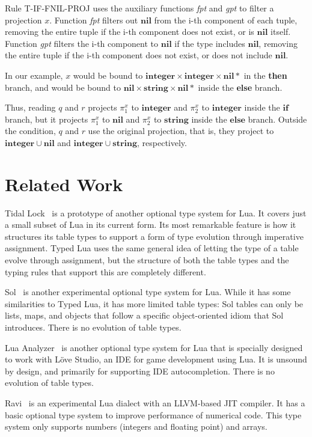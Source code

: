 \documentclass{sigplanconf}
\newcommand{\Nil}{\mathbf{nil}}
\newcommand{\Integer}{\mathbf{integer}}
\newcommand{\String}{\mathbf{string}}
\begin{document}
Rule \textsc{T-IF-FNIL-PROJ} uses the auxiliary functions \emph{fpt} and \emph{gpt}
to filter a projection $x$. Function {\em fpt} filters out $\Nil$ from the i-th
component of each tuple, removing the entire tuple if the i-th
component does not exist, or is $\Nil$ itself. Function {\em gpt}
filters the i-th component to $\Nil$ if the type includes
$\Nil$, removing the entire tuple if the i-th component does
not exist, or does not include $\Nil$.

In our example, $x$ would be bound to $\Integer \times \Integer \times \Nil{*}$ in the {\bf then} branch, and would be bound
to $\Nil \times \String \times \Nil{*}$ inside the {\bf else}
branch.

Thus, reading $q$ and $r$ projects $\pi_{1}^{x}$ to $\Integer$ and
$\pi_{2}^{x}$ to $\Integer$ inside the $\mathbf{if}$ branch,
but it projects $\pi_{1}^{x}$ to $\Nil$ and $\pi_{2}^{x}$ to $\String$
inside the $\mathbf{else}$ branch.
Outside the condition, $q$ and $r$ use the original projection, that is,
they project to $\Integer \cup \Nil$ and $\Integer \cup \String$, respectively.

\section{Related Work}
\label{sec:related}

Tidal Lock~\cite{tidallock} is a prototype of another optional type system for Lua. It covers just a small subset of Lua
in its current form. Its most remarkable feature is
how it structures its table types to support a form of type
evolution through imperative assignment. Typed Lua uses
the same general idea of letting the type of a table evolve
through assignment, but the structure of both the table types
and the typing rules that support this are completely different.

Sol~\cite{sol} is another experimental optional type system
for Lua. While it has some similarities to Typed Lua, it
has more limited table types: Sol tables can only be lists,
maps, and objects that follow a specific object-oriented
idiom that Sol introduces. There is no evolution of table
types.

Lua Analyzer~\cite{luaanalyzer} is another optional type
system for Lua that is specially designed to work with
Löve Studio, an IDE for game development using Lua.
It is unsound by design, and primarily for supporting
IDE autocompletion. There is no evolution of table types.

Ravi~\cite{ravi} is an experimental Lua dialect
with an LLVM-based JIT compiler. It has a basic
optional type system to improve performance
of numerical code. This type system only supports
numbers (integers and floating point) and arrays.
\end{document}
